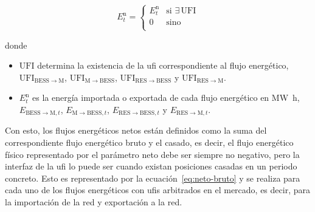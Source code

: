 \begin{samepage}

  \begin{equation}%
    \label{eq:desactivación-ufi}
    E^{\mathrm{n}}_{t} =
    \begin{cases}
      E^{\mathrm{n}}_{t} & \text{si } \exists \, \mathrm{UFI} \\
      0                  & \text{sino}                        \\
    \end{cases}
  \end{equation}

  donde

  \begin{itemize}

    \item \( \mathrm{UFI} \) determina la existencia de la \gls{ufi} correspondiente al flujo energético,  \( \mathrm{UFI}_{\mathrm{BESS} \rightarrow \mathrm{M}} \), \( \mathrm{UFI}_{\mathrm{M} \rightarrow \mathrm{BESS}} \), \( \mathrm{UFI}_{\mathrm{RES} \rightarrow \mathrm{BESS}} \) y \( \mathrm{UFI}_{\mathrm{RES} \rightarrow \mathrm{M}} \).

    \item \( E^{\mathrm{n}}_{t} \) es la energía importada o exportada de cada flujo energético en \si{{\mega\watt\hour}}, \( E_{\mathrm{BESS} \rightarrow \mathrm{M}, t} \), \( E_{\mathrm{M} \rightarrow \mathrm{BESS}, t} \), \( E_{\mathrm{RES} \rightarrow \mathrm{BESS}, t} \) y \( E_{\mathrm{RES} \rightarrow \mathrm{M}, t} \).

  \end{itemize}

\end{samepage}

Con esto, los flujos energéticos netos están definidos como la suma del correspondiente flujo energético bruto y el casado, es decir, el flujo energético físico representado por el parámetro neto debe ser siempre no negativo, pero la interfaz de la \gls{ufi} lo puede ser cuando existan posiciones casadas en un periodo concreto. Esto es representado por la ecuación~\ref{eq:neto-bruto} y se realiza para cada uno de los flujos energéticos con \glspl{ufi} arbitrados en el mercado, es decir, para la importación de la red y exportación a la red.

